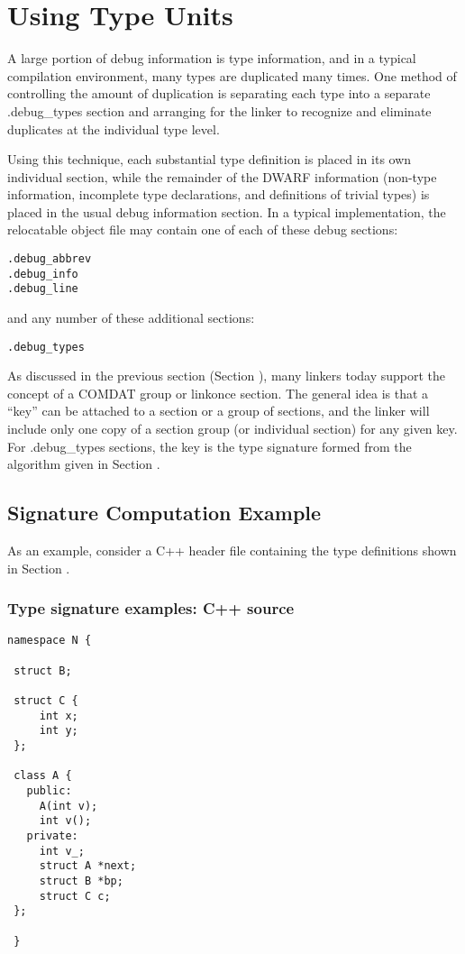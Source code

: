 \section{Using Type Units}
\label{app:usingtypeunits}

A large portion of debug information is type information, and
in a typical compilation environment, many types are duplicated
many times. One method of controlling the amount of duplication
is separating each type into a separate .debug\_types section
and arranging for the linker to recognize and eliminate
duplicates at the individual type level.

Using this technique, each substantial type definition is
placed in its own individual section, while the remainder
of the DWARF information (non-type information, incomplete
type declarations, and definitions of trivial types) is
placed in the usual debug information section. In a typical
implementation, the relocatable object file may contain one
of each of these debug sections:

\begin{alltt}
.debug\_abbrev
.debug\_info
.debug\_line
\end{alltt}

and any number of these additional sections:

\begin{alltt}
.debug\_types
\end{alltt}

As discussed in the previous section 
(Section ), 
many
linkers today support the concept of a COMDAT group or
linkonce section. The general idea is that a ``key'' can be
attached to a section or a group of sections, and the linker
will include only one copy of a section group (or individual
section) for any given key. For .debug\_types sections, the
key is the type signature formed from the algorithm given in
Section .

\subsection{Signature Computation Example}
\label{app:signaturecomputationexample}

As an example, consider a C++ header file 
containing the type definitions shown
in Section .

\subsubsection{ Type signature examples: C++ source}
\label{app:typesignatureexamplescsource}
\begin{lstlisting}
namespace N {

 struct B;

 struct C {
     int x;
     int y;
 };

 class A {
   public:
     A(int v);
     int v();
   private:
     int v_;
     struct A *next;
     struct B *bp;
     struct C c;
 };

 }
\end{lstlisting}

